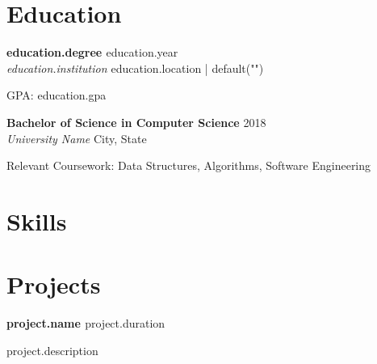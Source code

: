 \documentclass[a4paper,11pt]{article}
\newcommand{\job}[4]{\textbf{#1} \hfill #2 \\ \textit{#3} \hfill #4}
\begin{document}
{{{{{{{{{{{\section{Education}

{%
\job{ {{ education.degree }} }{ {{ education.year }} }{ {{ education.institution }} }{ {{ education.location | default("") }} }

{%
GPA: {{ education.gpa }}
{%
{%

{%
\job{Bachelor of Science in Computer Science}{2018}{University Name}{City, State}

Relevant Coursework: Data Structures, Algorithms, Software Engineering
{%

{%

{%
\section{Skills}


{%

{%
\section{Projects}

{%
\textbf{ {{ project.name }} } \hfill {{ project.duration }}

{{ project.description }}

{%

}}}}}}}}}}}}}}}}}}}}}}}
\end{document}
